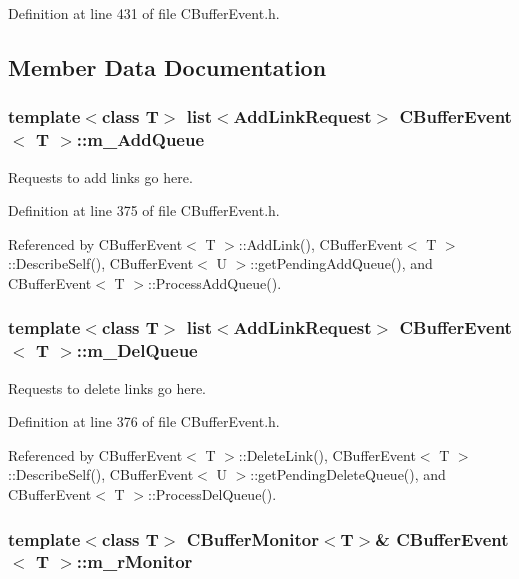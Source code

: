 Definition at line 431 of file CBuffer\-Event.h.

\subsection{Member Data Documentation}
\subsubsection{\setlength{\rightskip}{0pt plus 5cm}template$<$class T$>$ list$<${\bf Add\-Link\-Request}$>$ CBuffer\-Event$<$ T $>$::m\_\-Add\-Queue\hspace{0.3cm}{\tt  [private]}}\label{classCBufferEvent_o0}


Requests to add links go here.



Definition at line 375 of file CBuffer\-Event.h.

Referenced by CBuffer\-Event$<$ T $>$::Add\-Link(), CBuffer\-Event$<$ T $>$::Describe\-Self(), CBuffer\-Event$<$ U $>$::get\-Pending\-Add\-Queue(), and CBuffer\-Event$<$ T $>$::Process\-Add\-Queue().
\subsubsection{\setlength{\rightskip}{0pt plus 5cm}template$<$class T$>$ list$<${\bf Add\-Link\-Request}$>$ CBuffer\-Event$<$ T $>$::m\_\-Del\-Queue\hspace{0.3cm}{\tt  [private]}}\label{classCBufferEvent_o1}


Requests to delete links go here.



Definition at line 376 of file CBuffer\-Event.h.

Referenced by CBuffer\-Event$<$ T $>$::Delete\-Link(), CBuffer\-Event$<$ T $>$::Describe\-Self(), CBuffer\-Event$<$ U $>$::get\-Pending\-Delete\-Queue(), and CBuffer\-Event$<$ T $>$::Process\-Del\-Queue().
\subsubsection{\setlength{\rightskip}{0pt plus 5cm}template$<$class T$>$ {\bf CBuffer\-Monitor}$<$T$>$\& CBuffer\-Event$<$ T $>$::m\_\-r\-Monitor\hspace{0.3cm}{\tt  [private]}}\label{classCBufferEvent_o2}


